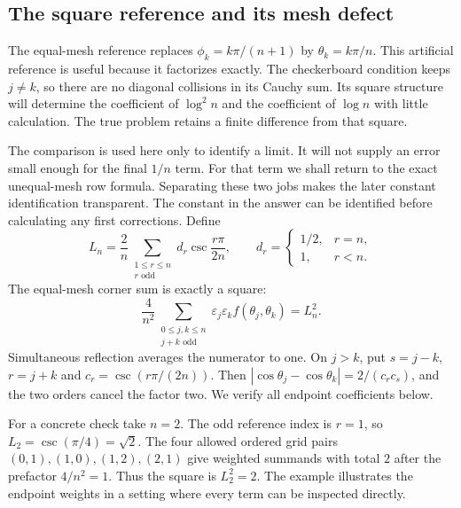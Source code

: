 \subsection{The square reference and its mesh defect}

The equal-mesh reference replaces $\phi_k=k\pi/(n+1)$ by
$\theta_k=k\pi/n$. This artificial reference is useful because it
factorizes exactly. The checkerboard condition keeps $j\ne k$,
so there are no diagonal collisions in its Cauchy sum. Its square
structure will determine the coefficient of $\log^2 n$ and the
coefficient of $\log n$ with little calculation. The true problem
retains a finite difference from that square.

The comparison is used here only to identify a limit. It will not
supply an error small enough for the final $1/n$ term. For that term
we shall return to the exact unequal-mesh row formula. Separating
these two jobs makes the later constant identification transparent.
The constant in the answer can be identified before calculating any
first corrections. Define
\[
 L_n=\frac2n\sum_{\substack{1\leq r\leq n\\r\text{ odd}}}
 d_r\csc\frac{r\pi}{2n},\qquad d_r=\begin{cases}1/2,&r=n,\\1,&r<n.\end{cases}
\]
The equal-mesh corner sum is exactly a square:
\begin{equation}\label{cu:square}
 \frac4{n^2}\sum_{\substack{0\leq j,k\leq n\\j+k\text{ odd}}}
 \varepsilon_j\varepsilon_k f(\theta_j,\theta_k)=L_n^2.
\end{equation}
Simultaneous reflection averages the numerator to one. On $j>k$,
put $s=j-k$, $r=j+k$ and $c_r=\csc(r\pi/(2n))$. Then
$|\cos\theta_j-\cos\theta_k|=2/(c_rc_s)$, and the two orders
cancel the factor two. We verify all endpoint coefficients below.

For a concrete check take $n=2$. The odd reference index is $r=1$,
so $L_2=\csc(\pi/4)=\sqrt2$. The four allowed ordered grid
pairs $(0,1),(1,0),(1,2),(2,1)$ give weighted summands with total
$2$ after the prefactor $4/n^2=1$. Thus the square is $L_2^2=2$.
The example illustrates the endpoint weights in a setting where
every term can be inspected directly.

